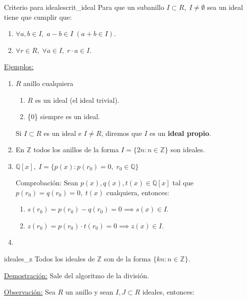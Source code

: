 \documentclass[10pt, a4paper]{article}
\newcommand{\Z}{\mathbb{Z}}
\newcommand{\Q}{\mathbb{Q}}
\newcommand{\obs}{\underline{Observación:} }
\newcommand{\ejs}{\underline{Ejemplos:} }
\newcommand{\demo}{\underline{Demostración:} }
\newenvironment{enumerater}{\begin{enumerate}[label=\roman*)]}
{\end{enumerate}}
\begin{document}
\begin{proposition}{Criterio para ideales}{crit_ideal}
Para que un subanillo $I \subset R, \; I \neq \emptyset$ sea un ideal tiene que cumplir que:

\begin{enumerate}[label=\roman*)]
	\item $\forall a, b \in I, \; a - b \in I \; (a + b \in I)$.
	\item $\forall r \in R, \; \forall a \in I, \; r \cdot a \in I$.
\end{enumerate}
\end{proposition}

\ejs
\begin{enumerate}[label=\arabic*)]
	\item $R$ anillo cualquiera
		\begin{enumerate}[label=\roman*)]
			\item $R$ es un ideal (el ideal trivial).
			\item \{0\} siempre es un ideal.
		\end{enumerate}

Si $I \subset R$ es un ideal e $I \neq R$, diremos que $I$ es un \textbf{ideal propio}.

	\item En $\Z$ todos los anillos de la forma $I = \{2n : n \in \Z\}$ son ideales.
	
	\item $\Q[x], \; I = \{p(x) : p(r_0) = 0, \; r_0 \in \Q \}$
			
			Comprobación: Sean $p(x), q(x), t(x) \in \Q[x]$ tal que $p(r_0) = q(r_0) = 0,  \; t(x)$ cualquiera, entonces:
		\begin{enumerater}
			\item $s(r_0) = p(r_0) - q(r_0) = 0 \implies s(x) \in I$.
			\item $z(r_0) = p(r_0) \cdot t(r_0) = 0 \implies z(x) \in I$.
		\end{enumerater}
	\item 
\end{enumerate}

\begin{proposition}{}{ideales_z}
Todos los ideales de $\Z$ son de la forma $\{kn : n \in \Z\}$.
\end{proposition}

\demo Sale del algoritmo de la división.

\vspace{5mm}

\obs Sea $R$ un anillo y sean $I, J \subset R$ ideales, entonces:
\end{document}
